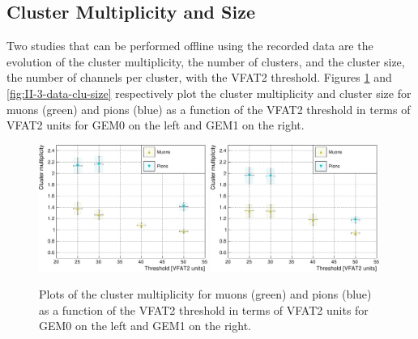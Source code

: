     \subsection{Cluster Multiplicity and Size}

      Two studies that can be performed offline using the recorded data are the evolution of the cluster multiplicity, the number of clusters, and the cluster size, the number of channels per cluster, with the VFAT2 threshold. Figures \ref{fig:II-3-data-clu-mult} and \ref{fig:II-3-data-clu-size} respectively plot the cluster multiplicity and cluster size for muons (green) and pions (blue) as a function of the VFAT2 threshold in terms of VFAT2 units for GEM0 on the left and GEM1 on the right. \\

      \begin{figure}[h!]
        \centering
        \includegraphics[width=0.49\textwidth]{img/plots/cClusterMultiplicity_Threshold_GEM0-crop}
        \includegraphics[width=0.49\textwidth]{img/plots/cClusterMultiplicity_Threshold_GEM1-crop}
        \caption{Plots of the cluster multiplicity for muons (green) and pions (blue) as a function of the VFAT2 threshold in terms of VFAT2 units for GEM0 on the left and GEM1 on the right.}
        \label{fig:II-3-data-clu-mult}
      \end{figure}

